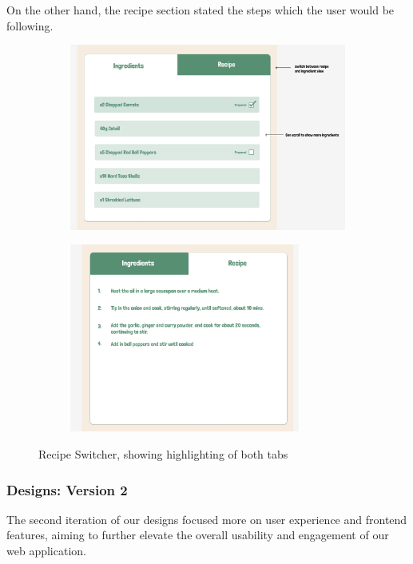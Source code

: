 \documentclass{article}
\begin{document}
On the other hand, the recipe section stated the steps which the user would be
following.

\begin{figure}[t]
  \centering
  \begin{subfigure}{0.45\linewidth}
    \includegraphics[width=\textwidth]{assets/Version 1 Recipe Switcher ingredients.png}
  \end{subfigure}
  \hfill
  \begin{subfigure}{0.45\linewidth}
    \includegraphics[width=0.83\textwidth]{assets/Version 1 Recipe Switcher recipe.png}
  \end{subfigure}
  \caption{Recipe Switcher, showing highlighting of both tabs}
\end{figure}

\subsubsection{Designs: Version 2}
The second iteration of our designs focused more on user experience and
frontend features, aiming to further elevate the overall usability and
engagement of our web application.
\end{document}
